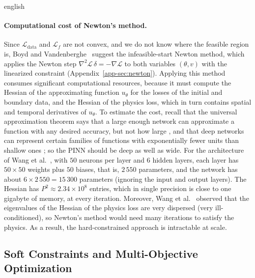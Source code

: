 \documentclass[11pt,letterpaper,twoside,openright]{book} %
\newcommand{\Loss}{\mathcal{L}}
\begin{document}
\begin{hyphenrules}{english}
\paragraph{Computational cost of Newton's method.}
Since $\Loss_{\mathrm{data}}$ and $\Loss_f$ are not convex, and we do not know where the feasible region
is, Boyd and Vandenberghe~\cite{boyd2004} suggest the infeasible-start Newton method, which applies the Newton step
$\nabla^2\mathscr{L}\,\delta=-\nabla\mathscr{L}$ to both variables $(\theta,v)$ with the linearized
constraint (Appendix~\ref{app-sec:newton}).
Applying this method consumes significant computational resources, because it must compute the Hessian
of the approximating function $u_\theta$ for the losses of the initial and boundary data, and the
Hessian of the physics loss, which in turn contains spatial and temporal derivatives of $u_\theta$. To
estimate the cost, recall that the universal approximation theorem says that a large enough network
can approximate a function with any desired accuracy, but not how large \cite{lecun2015}, and that
deep networks can represent certain families of functions with exponentially fewer units than shallow
ones \cite{delalleau2011}; so the PINN should be deep as well as wide. For the architecture of
Wang et al.~\cite{wang2021gradient}, with $50$ neurons per layer and $6$ hidden layers, each layer has
$50\times50$ weights plus $50$ biases, that is, $2\,550$ parameters, and the network has about
$6\times2\,550=15\,300$ parameters (ignoring the input and output layers). The Hessian has
$P^2\approx2.34\times10^{8}$ entries, which in single precision is close to one gigabyte of memory, at
every iteration. Moreover, Wang et al.~\cite{wang2021gradient} observed that the eigenvalues of the Hessian of
the physics loss are very dispersed (very ill-conditioned), so Newton's method would need many
iterations to satisfy the physics. As a result, the hard-constrained approach is intractable at scale.

\subsection{Soft Constraints and Multi-Objective Optimization}


\end{hyphenrules}
\end{document}
